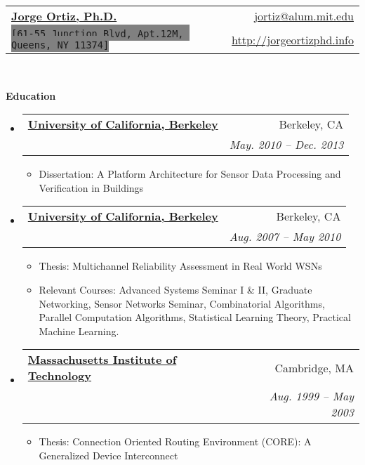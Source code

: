 \documentclass[letterpaper,11pt]{article}
\makeatletter
\newcommand{\resitem}[1]{\item #1 \vspace{-2pt}}
\newcommand{\resheading}[1]{{\large \colorbox{mygrey}{\begin{minipage}{\textwidth}{\textbf{#1 \vphantom{p\^{E}}}}\end{minipage}}}}
\newcommand{\ressubheading}[4]{
\begin{tabular*}{6.5in}{l@{\extracolsep{\fill}}r}
		\textbf{#1} & #2 \\
		\textit{#3} & \textit{#4} \\
\end{tabular*}\vspace{-6pt}}
\makeatother
\begin{document}
\newcommand{\mywebheader}{
\begin{tabular*}{7in}{l@{\extracolsep{\fill}}r}
	\textbf{\href{http://researcher.ibm.com/researcher/view.php?person=us-jjortiz}{\LARGE Jorge Ortiz, Ph.D.}} & \href{mailto:jortiz@alum.mit.edu}{jortiz@alum.mit.edu}\\
	{\footnotesize \texttt{\colorbox{gray}{[61-55 Junction Blvd, Apt.12M, Queens, NY 11374]}}} & \href{http://jorgeortizphd.info}{http://jorgeortizphd.info} \\
	\end{tabular*}
\\
\vspace{0.1in}}

\mywebheader

\resheading{Education}
	\begin{itemize}
        \item
            \ressubheading{\href{}{University of California, Berkeley}}{Berkeley, CA}{\href{}{Doctor of Philosophy in Computer Science}; \href{}}{May. 2010 -- Dec. 2013}
                { \footnotesize
				\begin{itemize}
					\resitem{Dissertation: A Platform Architecture for Sensor Data Processing and Verification in Buildings}
				\end{itemize}
				}
        \item
            \ressubheading{\href{}{University of California, Berkeley}}{Berkeley, CA}{\href{}{Masters of Science in Computer Science}; \href{}}{Aug. 2007 -- May 2010}
                { \footnotesize
				\begin{itemize}
					\resitem{Thesis: Multichannel Reliability Assessment in Real World WSNs}
                    \resitem{Relevant Courses: Advanced Systems Seminar I \& II, Graduate Networking, Sensor Networks Seminar, Combinatorial Algorithms, Parallel Computation Algorithms, Statistical Learning Theory, Practical Machine Learning.}
				\end{itemize}
				}
       \item
            \ressubheading{\href{}{Massachusetts Institute of Technology}}{Cambridge, MA}{\href{}{Bachelors of Science in Computer Science and Engineering}; \href{}}{Aug. 1999 -- May 2003}
                { \footnotesize
				\begin{itemize}
					\resitem{Thesis: Connection Oriented Routing Environment (CORE): A Generalized Device         Interconnect}
				\end{itemize}
				}
    \end{itemize} %
\end{document}
